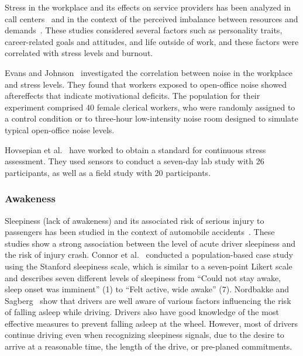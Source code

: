 Stress in the workplace and its effects on service providers has been analyzed in call centers~\cite{Hernandez11} and in the context of the perceived imbalance between resources and demands~\cite{cherniss80}. These studies considered several factors such as personality traits, career-related goals and attitudes, and life outside of work, and these factors were correlated with stress levels and burnout.

Evans and Johnson~\cite{evans00} investigated the correlation between noise in the workplace and stress levels.
They found that workers exposed to open-office noise showed aftereffects that indicate motivational deficits.
The population for their experiment comprised 40 female clerical workers, who were randomly assigned to a control condition or to three-hour low-intensity noise room designed to simulate typical open-office noise levels.

Hovsepian et al.~\cite{Hovsepian15} have worked to obtain a standard for continuous stress assessment. They used sensors to conduct a seven-day lab study with 26 participants, as well as a field study with 20 participants.

\subsubsection{Awakeness}

Sleepiness (lack of awakeness) and its associated risk of serious injury to passengers has been studied in the context of automobile 
accidents~\cite{connor02,Nordbakke07}.
These studies show a strong association between the level of acute driver sleepiness and the risk of injury crash.
Connor et al.~\cite{connor02} conducted a population-based case study using the Stanford sleepiness scale, which is similar to a seven-point Likert scale and describes seven different levels of sleepiness from ``Could not stay awake, sleep onset was imminent'' (1) to ``Felt active, wide awake'' (7).
Nordbakke and Sagberg~\cite{Nordbakke07} show that drivers are well aware of  various factors influencing the risk of falling asleep while driving. Drivers also have good knowledge of the most effective measures to prevent falling asleep at the wheel.
However, most of drivers continue driving even when recognizing sleepiness signals, due to the desire to arrive at a reasonable time, the length of the drive, or pre-planed commitments.


